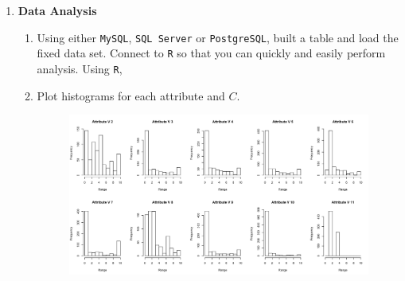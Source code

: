 \documentclass{article}
\begin{document}
\begin{enumerate}
  \item {\bf Data Analysis}
   \begin{enumerate} \item Using either \texttt{MySQL}, \texttt{SQL Server} or \texttt{PostgreSQL}, built a table and load the fixed data set.  Connect to \texttt{R} so that you can quickly and easily perform analysis.  Using \texttt{R}, 
\item Plot histograms for each attribute and $C$.\\
\begin{figure}[h]
\centering
\includegraphics[width=0.7\linewidth]{histforallvalue}
\caption{}
\label{fig:histforallvalue}
\end{figure}


\end{enumerate}
\end{enumerate}
\end{document}
